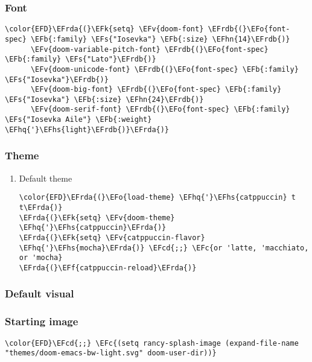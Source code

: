 \documentclass[12pt]{article}
\theoremstyle{plain}%
\theoremstyle{definition}
\theoremstyle{remark}
\newcommand{\EFc}[1]{\textcolor{EFc}{#1}} %
\newcommand{\EFcd}[1]{\textcolor{EFcd}{#1}} %
\newcommand{\EFs}[1]{\textcolor{EFs}{#1}} %
\newcommand{\EFk}[1]{\textcolor{EFk}{#1}} %
\newcommand{\EFb}[1]{\textcolor{EFb}{#1}} %
\newcommand{\EFf}[1]{\textcolor{EFf}{#1}} %
\newcommand{\EFv}[1]{\textcolor{EFv}{#1}} %
\newcommand{\EFo}[1]{\textcolor{EFo}{#1}} %
\newcommand{\EFhn}[1]{\textcolor{EFhn}{\textbf{#1}}} %
\newcommand{\EFhq}[1]{\textcolor{EFhq}{#1}} %
\newcommand{\EFhs}[1]{\textcolor{EFhs}{#1}} %
\newcommand{\EFrda}[1]{\textcolor{EFrda}{#1}} %
\newcommand{\EFrdb}[1]{\textcolor{EFrdb}{#1}} %
\begin{document}
\subsubsection{Font}
\label{sec:org25b5a7f}
\begin{Code}
\begin{Verbatim}
\color{EFD}\EFrda{(}\EFk{setq} \EFv{doom-font} \EFrdb{(}\EFo{font-spec} \EFb{:family} \EFs{"Iosevka"} \EFb{:size} \EFhn{14}\EFrdb{)}
      \EFv{doom-variable-pitch-font} \EFrdb{(}\EFo{font-spec} \EFb{:family} \EFs{"Lato"}\EFrdb{)}
      \EFv{doom-unicode-font} \EFrdb{(}\EFo{font-spec} \EFb{:family} \EFs{"Iosevka"}\EFrdb{)}
      \EFv{doom-big-font} \EFrdb{(}\EFo{font-spec} \EFb{:family} \EFs{"Iosevka"} \EFb{:size} \EFhn{24}\EFrdb{)}
      \EFv{doom-serif-font} \EFrdb{(}\EFo{font-spec} \EFb{:family} \EFs{"Iosevka Aile"} \EFb{:weight} \EFhq{'}\EFhs{light}\EFrdb{)}\EFrda{)}
\end{Verbatim}
\end{Code}
\subsubsection{Theme}
\label{sec:org1e346bd}
\begin{enumerate}
\item Default theme
\label{sec:org869e76b}
\begin{Code}
\begin{Verbatim}
\color{EFD}\EFrda{(}\EFo{load-theme} \EFhq{'}\EFhs{catppuccin} t t\EFrda{)}
\EFrda{(}\EFk{setq} \EFv{doom-theme} \EFhq{'}\EFhs{catppuccin}\EFrda{)}
\EFrda{(}\EFk{setq} \EFv{catppuccin-flavor} \EFhq{'}\EFhs{mocha}\EFrda{)} \EFcd{;;} \EFc{or 'latte, 'macchiato, or 'mocha}
\EFrda{(}\EFf{catppuccin-reload}\EFrda{)}
\end{Verbatim}
\end{Code}
\end{enumerate}
\subsubsection{Default visual}
\label{sec:org376d08b}
\subsubsection{Starting image}
\label{sec:org27b0a20}
\begin{Code}
\begin{Verbatim}
\color{EFD}\EFcd{;;} \EFc{(setq rancy-splash-image (expand-file-name "themes/doom-emacs-bw-light.svg" doom-user-dir))}
\end{Verbatim}
\end{Code}
\end{document}
